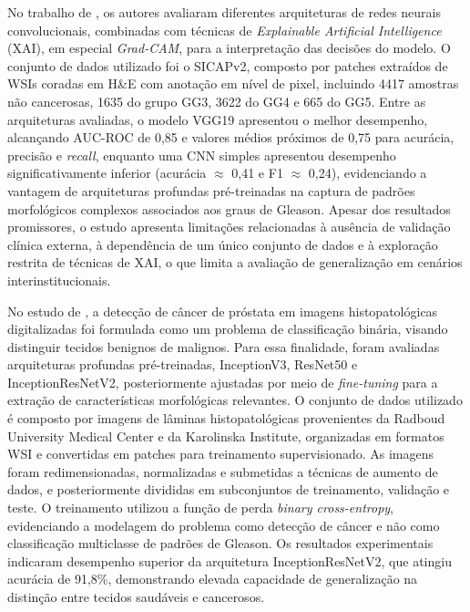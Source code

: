 No trabalho de \cite{kosoko2024xai_prostate}, os autores avaliaram diferentes arquiteturas de redes neurais convolucionais, combinadas com técnicas de \textit{Explainable Artificial Intelligence} (XAI), em especial \textit{Grad-CAM}, para a interpretação das decisões do modelo. O conjunto de dados utilizado foi o SICAPv2, composto por patches extraídos de WSIs coradas em H\&E com anotação em nível de pixel, incluindo 4417 amostras não cancerosas, 1635 do grupo GG3, 3622 do GG4 e 665 do GG5. Entre as arquiteturas avaliadas, o modelo VGG19 apresentou o melhor desempenho, alcançando AUC-ROC de 0{,}85 e valores médios próximos de 0{,}75 para acurácia, precisão e \textit{recall}, enquanto uma CNN simples apresentou desempenho significativamente inferior (acurácia $\approx$ 0{,}41 e F1 $\approx$ 0{,}24), evidenciando a vantagem de arquiteturas profundas pré-treinadas na captura de padrões morfológicos complexos associados aos graus de Gleason. Apesar dos resultados promissores, o estudo apresenta limitações relacionadas à ausência de validação clínica externa, à dependência de um único conjunto de dados e à exploração restrita de técnicas de XAI, o que limita a avaliação de generalização em cenários interinstitucionais.

No estudo de \cite{afifi2024prostate}, a detecção de câncer de próstata em imagens histopatológicas digitalizadas foi formulada como um problema de classificação binária, visando distinguir tecidos benignos de malignos. Para essa finalidade, foram avaliadas arquiteturas profundas pré-treinadas, InceptionV3, ResNet50 e InceptionResNetV2, posteriormente ajustadas por meio de \textit{fine-tuning} para a extração de características morfológicas relevantes. O conjunto de dados utilizado é composto por imagens de lâminas histopatológicas provenientes da Radboud University Medical Center e da Karolinska Institute, organizadas em formatos WSI e convertidas em patches para treinamento supervisionado. As imagens foram redimensionadas, normalizadas e submetidas a técnicas de aumento de dados, e posteriormente divididas em subconjuntos de treinamento, validação e teste. O treinamento utilizou a função de perda \textit{binary cross-entropy}, evidenciando a modelagem do problema como detecção de câncer e não como classificação multiclasse de padrões de Gleason. Os resultados experimentais indicaram desempenho superior da arquitetura InceptionResNetV2, que atingiu acurácia de 91,8\%, demonstrando elevada capacidade de generalização na distinção entre tecidos saudáveis e cancerosos.

